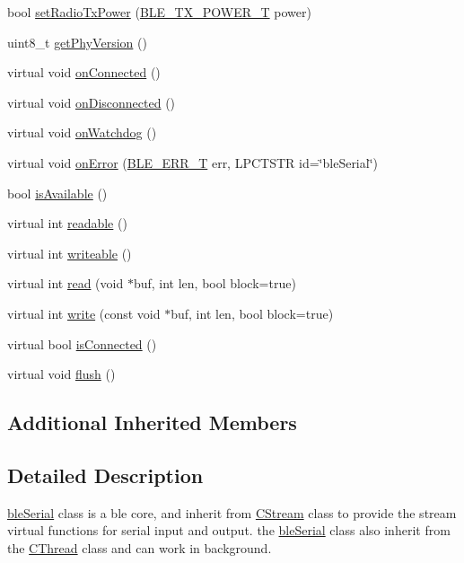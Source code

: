 \begin{DoxyCompactItemize}
\item 
bool \hyperlink{classble_serial_acddad359ad714bd31358c96966839a61}{set\-Radio\-Tx\-Power} (\hyperlink{classble_serial_a5a80fa5bef696de05146980acdd68f3c}{B\-L\-E\-\_\-\-T\-X\-\_\-\-P\-O\-W\-E\-R\-\_\-\-T} power)
\item 
uint8\-\_\-t \hyperlink{classble_serial_a6aea16b265aa98f0a540f71b75965408}{get\-Phy\-Version} ()
\item 
virtual void \hyperlink{classble_serial_adb930ce55295ff7eb6ab5bdbeb702749}{on\-Connected} ()
\item 
virtual void \hyperlink{classble_serial_aa6f5116c8bcf05011a05ad5e2967c318}{on\-Disconnected} ()
\item 
virtual void \hyperlink{classble_serial_a8af315789cc459a1fde96ac80ca9ffb7}{on\-Watchdog} ()
\item 
virtual void \hyperlink{classble_serial_a8a0622f5d10fe2242978a16b2d1e6ee4}{on\-Error} (\hyperlink{classble_serial_a46e393eb31428307fde06a2788920ce2}{B\-L\-E\-\_\-\-E\-R\-R\-\_\-\-T} err, L\-P\-C\-T\-S\-T\-R id=\char`\"{}ble\-Serial\char`\"{})
\item 
bool \hyperlink{classble_serial_a1691c5c5655043512bf1c462e6928488}{is\-Available} ()
\item 
virtual int \hyperlink{classble_serial_a59dca8e3e2d6945a699347f4c4708fd4}{readable} ()
\item 
virtual int \hyperlink{classble_serial_ac42a8f805e6784e0fa2064270b5288a1}{writeable} ()
\item 
virtual int \hyperlink{classble_serial_a186e09706d9b6e58a6213ac0b6a220ad}{read} (void $\ast$buf, int len, bool block=true)
\item 
virtual int \hyperlink{classble_serial_ab9d147e7dcb9436f390f2ad29d539930}{write} (const void $\ast$buf, int len, bool block=true)
\item 
virtual bool \hyperlink{classble_serial_aebfde0d9a7583cb641ac60f02df7cd77}{is\-Connected} ()
\item 
virtual void \hyperlink{classble_serial_ad41b78cc1b0fc02ce65248147b32ffa8}{flush} ()
\end{DoxyCompactItemize}
\subsection*{Additional Inherited Members}


\subsection{Detailed Description}
\hyperlink{classble_serial}{ble\-Serial} class is a ble core, and inherit from \hyperlink{class_c_stream}{C\-Stream} class to provide the stream virtual functions for serial input and output. the \hyperlink{classble_serial}{ble\-Serial} class also inherit from the \hyperlink{class_c_thread}{C\-Thread} class and can work in background. 

